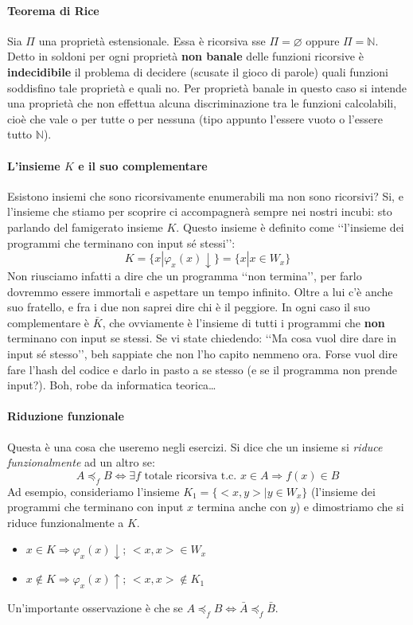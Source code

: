 \documentclass[a4paper,oneside]{scrbook}
\begin{document}
\paragraph{Teorema di Rice}
Sia $\Pi$ una proprietà estensionale. Essa è ricorsiva sse $\Pi=\varnothing$ oppure $\Pi=\mathbb{N}$.
Detto in soldoni per ogni proprietà \textbf{non banale} delle funzioni ricorsive è \textbf{indecidibile} il problema di decidere (scusate il gioco di parole)
quali funzioni soddisfino tale proprietà e quali no. Per proprietà banale in questo caso si intende una proprietà che non effettua alcuna discriminazione
tra le funzioni calcolabili, cioè che vale o per tutte o per nessuna (tipo appunto l'essere vuoto o l'essere tutto $\mathbb{N}$).

\paragraph{L'insieme $K$ e il suo complementare}
Esistono insiemi che sono ricorsivamente enumerabili ma non sono ricorsivi? Si, e l'insieme che stiamo per scoprire ci accompagnerà sempre
nei nostri incubi: sto parlando del famigerato insieme $K$. Questo insieme è definito come ‘‘l'insieme dei programmi che terminano con input
sé stessi’’:
\begin{equation*}
K=\{x|\varphi_x(x)\downarrow\} = \{x|x\in W_x\}
\end{equation*}
Non riusciamo infatti a dire che un programma ‘‘non termina’’, per farlo dovremmo essere immortali e aspettare un tempo infinito.
Oltre a lui c'è anche suo fratello, e fra i due non saprei dire chi è il peggiore. In ogni caso il suo complementare è $\bar{K}$,
che ovviamente è l'insieme di tutti i programmi che \textbf{non} terminano con input se stessi.
Se vi state chiedendo: ‘‘Ma cosa vuol dire dare in input sé stesso’’, beh sappiate che non l'ho capito nemmeno ora. Forse vuol dire
fare l'hash del codice e darlo in pasto a se stesso (e se il programma non prende input?). Boh, robe da informatica teorica\dots

\paragraph{Riduzione funzionale}
Questa è una cosa che useremo negli esercizi. Si dice che un insieme si \textit{riduce funzionalmente} ad un altro se:
\begin{equation*}
A \preceq_f B \Leftrightarrow \exists f \text{ totale ricorsiva t.c. } x \in A \Rightarrow f(x)\in B
\end{equation*}
Ad esempio, consideriamo l'insieme $K_1=\{<x,y>|y\in W_x\}$ (l'insieme dei programmi che terminano con input $x$ termina anche con $y$) e dimostriamo che si riduce
funzionalmente a $K$.
\begin{itemize}
	\item $x\in K \Rightarrow \varphi_x(x)\downarrow$; $<x,x> \in W_x$
	\item $x\notin K \Rightarrow \varphi_x(x)\uparrow$; $<x,x> \notin K_1$
\end{itemize}
Un'importante osservazione è che se $A\preceq_f B \iff \bar{A} \preceq_f \bar{B}$.
\end{document}
